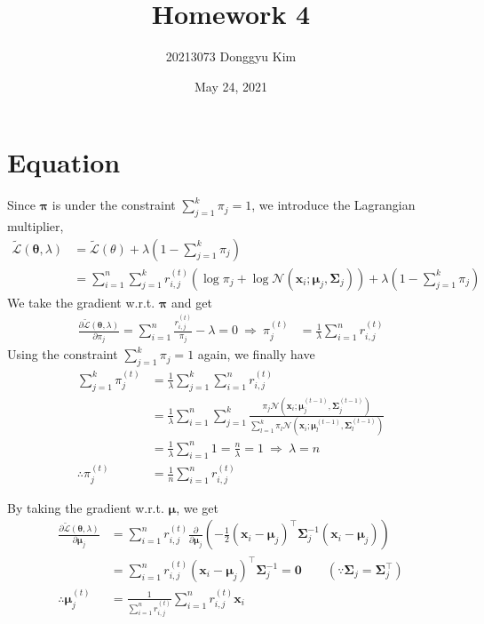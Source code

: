 \documentclass[11pt]{article}
\title{Homework 4}
\author{20213073 Donggyu Kim}
\date{May 24, 2021}
\begin{document}
\maketitle
\thispagestyle{fancy}

\section{Equation}
Since $\bm\pi$ is under the constraint $\sum_{j=1}^{k}\pi_{j}=1$, we introduce the Lagrangian multiplier,
\begin{align*}
\tilde{\mathcal{L}}(\bm\theta,\lambda)
&=\tilde{\mathcal{L}}(\theta)+\lambda\left(1-\sum_{j=1}^{k}\pi_{j}\right) \\
&=\sum_{i=1}^{n}\sum_{j=1}^{k}r_{i,j}^{(t)}(\log\pi_{j}+\log\mathcal{N}(\bm x_{i};\bm\mu_{j},\bm\Sigma_{j}))+\lambda\left(1-\sum_{j=1}^{k}\pi_{j}\right)
\end{align*}
We take the gradient w.r.t. $\bm\pi$ and get
\begin{align*}
\frac{\partial\tilde{\mathcal{L}}(\bm\theta,\lambda)}{\partial\pi_{j}}
=\sum_{i=1}^{n}\frac{r_{i,j}^{(t)}}{\pi_{j}}-\lambda=0\ \Rightarrow\ \pi_{j}^{(t)}
&=\frac{1}{\lambda}\sum_{i=1}^{n}r_{i,j}^{(t)}
\end{align*}
Using the constraint $\sum_{j=1}^{k}\pi_{j}=1$ again, we finally have
\begin{align*}
\sum_{j=1}^{k}\pi_{j}^{(t)}
&=\frac{1}{\lambda}\sum_{j=1}^{k}\sum_{i=1}^{n}r_{i,j}^{(t)} \\
&=\frac{1}{\lambda}\sum_{i=1}^{n}\sum_{j=1}^{k}\frac{\pi_{j}\mathcal{N}(\bm x_{i};\bm\mu_{j}^{(t-1)},\bm\Sigma_{j}^{(t-1)})}{\sum_{l=1}^{k}\pi_{l}\mathcal{N}(\bm x_{i};\bm\mu_{l}^{(t-1)},\bm\Sigma_{l}^{(t-1)})} \\
&=\frac{1}{\lambda}\sum_{i=1}^{n}1=\frac{n}{\lambda}=1\ \Rightarrow\ \lambda=n \\
\therefore\pi_{j}^{(t)} &= \frac{1}{n}\sum_{i=1}^{n}r_{i,j}^{(t)}
\end{align*}

By taking the gradient w.r.t. $\bm\mu$, we get
\begin{align*}
\frac{\partial\tilde{\mathcal{L}}(\bm\theta,\lambda)}{\partial\bm\mu_{j}}
&=\sum_{i=1}^{n}r_{i,j}^{(t)}\frac{\partial}{\partial\bm\mu_{j}}\left(-\frac{1}{2}(\bm x_{i}-\bm\mu_{j})^{\top}\bm\Sigma_{j}^{-1}(\bm x_{i}-\bm\mu_{j})\right) \\
&=\sum_{i=1}^{n}r_{i,j}^{(t)}(\bm x_{i}-\bm\mu_{j})^{\top}\bm\Sigma_{j}^{-1}=\bm 0 \qquad (\because\bm\Sigma_{j}=\bm\Sigma_{j}^{\top}) \\
\therefore\bm\mu_{j}^{(t)}&=\frac{1}{\sum_{i=1}^{n}r_{i,j}^{(t)}}\sum_{i=1}^{n}r_{i,j}^{(t)}\bm x_{i}
\end{align*}
\end{document}

